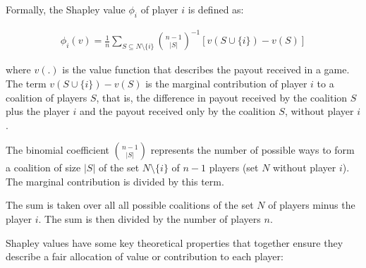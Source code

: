 Formally, the Shapley value $\phi_i$ of player $i$ is defined as:

\begin{align*}
\phi_i(v) = \frac{1}{n} \sum_{S \subseteq N \setminus \{i\}} \binom{n-1}{|S|}^{-1} \left[ v(S \cup \{i\}) - v(S)\right]
\end{align*}

where $v(.)$ is the value function that describes the payout received in a game. The term $v(S \cup \{i\}) - v(S)$ is the marginal contribution of player $i$ to a coalition of players $S$, that is, the difference in payout received by the coalition $S$ plus the player $i$ and the payout received only by the coalition $S$, without player $i$. 

The binomial coefficient $\binom{n-1}{|S|}$ represents the number of possible ways to form a coalition of size $|S|$ of the set $N \setminus \{i\}$ of $n-1$ players (set $N$ without player $i$). The marginal contribution is divided by this term. 

The sum is taken over all all possible coalitions of the set $N$ of players minus the player $i$. The sum is then divided by the number of players $n$.

Shapley values have some key theoretical properties that together ensure they describe a fair allocation of value or contribution to each player:

